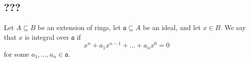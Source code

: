 \subsection{???}
\begin{definition}
    Let \( A \subseteq B \) be an extension of rings, let \( \mathfrak a \subseteq A \) be an ideal, and let \( x \in B \).
    We say that \( x \) is integral over \( \mathfrak a \) if
    \[ x^n + a_1 x^{n-1} + \dots + a_n x^0 = 0 \]
    for some \( a_1, \dots, a_n \in \mathfrak a \).
\end{definition}
